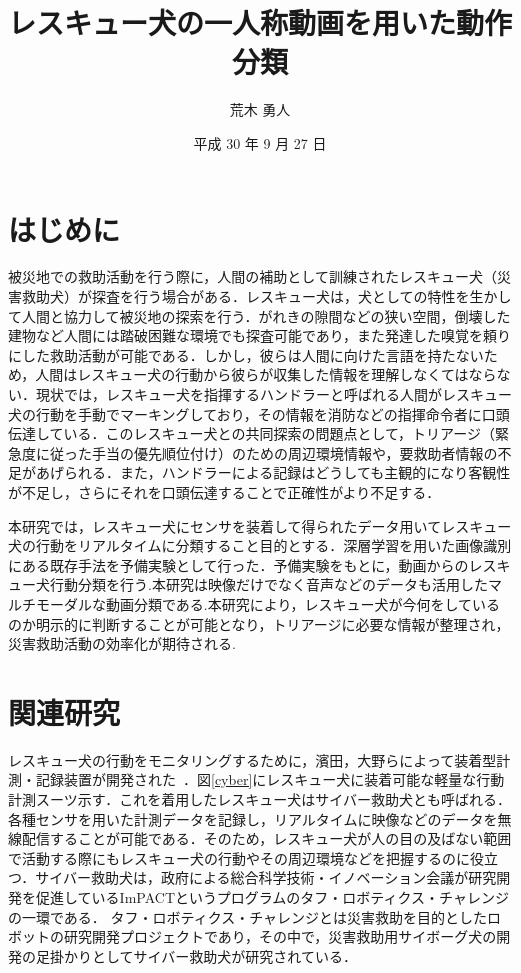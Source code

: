 \documentclass[twocolumn, a4paper]{UECIEresume}
\title{レスキュー犬の一人称動画を用いた動作分類}
\date{平成 30 年 9 月 27 日}
\affiliation{情報学専攻 メディア情報学 プログラム}
\author{荒木 勇人}
\renewcommand{\baselinestretch}{0.97}
\begin{document}
\maketitle

\section{はじめに}
被災地での救助活動を行う際に，人間の補助として訓練されたレスキュー犬（災害救助犬）が探査を行う場合がある．レスキュー犬は，犬としての特性を生かして人間と協力して被災地の探索を行う．がれきの隙間などの狭い空間，倒壊した建物など人間には踏破困難な環境でも探査可能であり，また発達した嗅覚を頼りにした救助活動が可能である．しかし，彼らは人間に向けた言語を持たないため，人間はレスキュー犬の行動から彼らが収集した情報を理解しなくてはならない．現状では，レスキュー犬を指揮するハンドラーと呼ばれる人間がレスキュー犬の行動を手動でマーキングしており，その情報を消防などの指揮命令者に口頭伝達している．このレスキュー犬との共同探索の問題点として，トリアージ（緊急度に従った手当の優先順位付け）のための周辺環境情報や，要救助者情報の不足があげられる．また，ハンドラーによる記録はどうしても主観的になり客観性が不足し，さらにそれを口頭伝達することで正確性がより不足する．

本研究では，レスキュー犬にセンサを装着して得られたデータ用いてレスキュー犬の行動をリアルタイムに分類すること目的とする．深層学習を用いた画像識別にある既存手法を予備実験として行った．予備実験をもとに，動画からのレスキュー犬行動分類を行う.本研究は映像だけでなく音声などのデータも活用したマルチモーダルな動画分類である.本研究により，レスキュー犬が今何をしているのか明示的に判断することが可能となり，トリアージに必要な情報が整理され，災害救助活動の効率化が期待される.

\section{関連研究}

レスキュー犬の行動をモニタリングするために，濱田，大野らによって装着型計測・記録装置が開発された~\cite{dog01}．図\ref{cyber}にレスキュー犬に装着可能な軽量な行動計測スーツ示す．これを着用したレスキュー犬はサイバー救助犬とも呼ばれる．各種センサを用いた計測データを記録し，リアルタイムに映像などのデータを無線配信することが可能である．そのため，レスキュー犬が人の目の及ばない範囲で活動する際にもレスキュー犬の行動やその周辺環境などを把握するのに役立つ．サイバー救助犬は，政府による総合科学技術・イノベーション会議が研究開発を促進しているImPACTというプログラムのタフ・ロボティクス・チャレンジの一環である．
タフ・ロボティクス・チャレンジとは災害救助を目的としたロボットの研究開発プロジェクトであり，その中で，災害救助用サイボーグ犬の開発の足掛かりとしてサイバー救助犬が研究されている．
\end{document}
